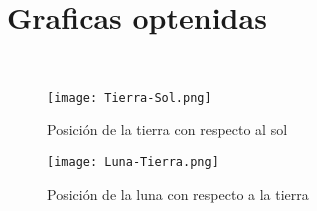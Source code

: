 \documentclass{article}
\begin{document}
\section{Graficas optenidas}\
\begin{figure}
\texttt{[image: Tierra-Sol.png]}
\caption{Posición de la tierra con respecto al sol}
\label{fig:Figura1}
\end{figure}
\begin{figure}
\texttt{[image: Luna-Tierra.png]}
\caption{Posición de la luna con respecto a la tierra}
\label{fig:Figura2}
\end{figure}
\end{document}
